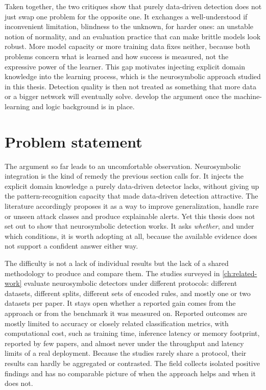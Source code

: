 Taken together, the two critiques show that purely data-driven detection
does not just swap one problem for the opposite one. It exchanges a
well-understood if inconvenient limitation, blindness to the unknown, for
harder ones: an unstable notion of normality, and an evaluation practice
that can make brittle models look robust. More model capacity or more
training data fixes neither, because both problems concern what is learned
and how success is measured, not the expressive power of the learner. This
gap motivates injecting explicit domain knowledge into the learning process,
which is the neurosymbolic approach studied in this thesis. Detection quality
is then not treated as something that more data or a bigger network will
eventually solve.  develop the argument
once the machine-learning and logic background is in place.

\section{Problem statement}
\label{sec:problem-statement}

The argument so far leads to an uncomfortable observation. Neurosymbolic
integration is the kind of remedy the previous section calls for. It injects
the explicit domain knowledge a purely data-driven detector lacks, without
giving up the pattern-recognition capacity that made data-driven detection
attractive. The literature accordingly proposes it as a way to improve
generalization, handle rare or unseen attack classes and produce explainable
alerts. Yet this thesis does not set out to show that neurosymbolic
detection works. It asks \emph{whether}, and under which conditions, it is
worth adopting at all, because the available evidence does not support a
confident answer either way.

The difficulty is not a lack of individual results but the lack of a shared
methodology to produce and compare them. The studies surveyed in
\cref{ch:related-work} evaluate neurosymbolic detectors under different
protocols: different datasets, different splits, different sets of encoded
rules, and mostly one or two datasets per paper. It stays open whether a
reported gain comes from the approach or from the benchmark it was measured
on. Reported outcomes are mostly limited to accuracy or closely related
classification metrics, with computational cost, such as training time, inference latency or memory
footprint, reported by few papers, and almost never under
the throughput and latency limits of a real deployment. Because the
studies rarely share a protocol, their results can hardly be aggregated or
contrasted. The
field collects isolated positive findings and has no comparable picture of
when the approach helps and when it does not.


